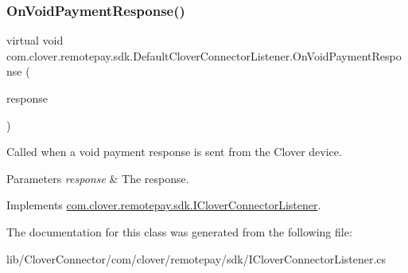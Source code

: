 \subsubsection{\texorpdfstring{On\+Void\+Payment\+Response()}{OnVoidPaymentResponse()}}
{\footnotesize\ttfamily virtual void com.\+clover.\+remotepay.\+sdk.\+Default\+Clover\+Connector\+Listener.\+On\+Void\+Payment\+Response (\begin{DoxyParamCaption}\item[{\hyperlink{classcom_1_1clover_1_1remotepay_1_1sdk_1_1_void_payment_response}{Void\+Payment\+Response}}]{response }\end{DoxyParamCaption})\hspace{0.3cm}{\ttfamily [virtual]}}



Called when a void payment response is sent from the Clover device. 


\begin{DoxyParams}{Parameters}
{\em response} & The response.\\
\hline
\end{DoxyParams}


Implements \hyperlink{interfacecom_1_1clover_1_1remotepay_1_1sdk_1_1_i_clover_connector_listener_adc94ebf628d9ad0bf3f2b537f1de30f2}{com.\+clover.\+remotepay.\+sdk.\+I\+Clover\+Connector\+Listener}.



The documentation for this class was generated from the following file\+:\begin{DoxyCompactItemize}
\item 
lib/\+Clover\+Connector/com/clover/remotepay/sdk/I\+Clover\+Connector\+Listener.\+cs\end{DoxyCompactItemize}
